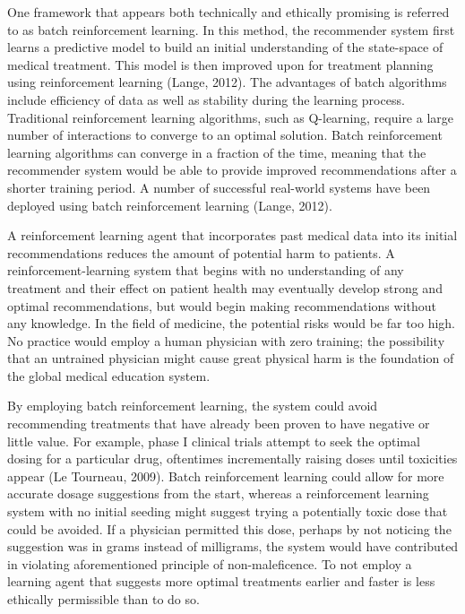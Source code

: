 \documentclass[]{spie}  %
\begin{document}
One framework that appears both technically and ethically promising is referred to as batch reinforcement learning. In this method, the recommender system first learns a predictive model to build an initial understanding of the state-space of medical treatment. This model is then improved upon for treatment planning using reinforcement learning (Lange, 2012). The advantages of batch algorithms include efficiency of data as well as stability during the learning process. Traditional reinforcement learning algorithms, such as Q-learning, require a large number of interactions to converge to an optimal solution. Batch reinforcement learning algorithms can converge in a fraction of the time, meaning that the recommender system would be able to provide improved recommendations after a shorter training period. A number of successful real-world systems have been deployed using batch reinforcement learning (Lange, 2012).

A reinforcement learning agent that incorporates past medical data into its initial recommendations reduces the amount of potential harm to patients. A reinforcement-learning system that begins with no understanding of any treatment and their effect on patient health may eventually develop strong and optimal recommendations, but would begin making recommendations without any knowledge. In the field of medicine, the potential risks would be far too high. No practice would employ a human physician with zero training; the possibility that an untrained physician might cause great physical harm is the foundation of the global medical education system.

By employing batch reinforcement learning, the system could avoid recommending treatments that have already been proven to have negative or little value. For example, phase I clinical trials attempt to seek the optimal dosing for a particular drug, oftentimes incrementally raising doses until toxicities appear (Le Tourneau, 2009). Batch reinforcement learning could allow for more accurate dosage suggestions from the start, whereas a reinforcement learning system with no initial seeding might suggest trying a potentially toxic dose that could be avoided. If a physician permitted this dose, perhaps by not noticing the suggestion was in grams instead of milligrams, the system would have contributed in violating aforementioned principle of non-maleficence. To not employ a learning agent that suggests more optimal treatments earlier and faster is less ethically permissible than to do so.
\end{document}
